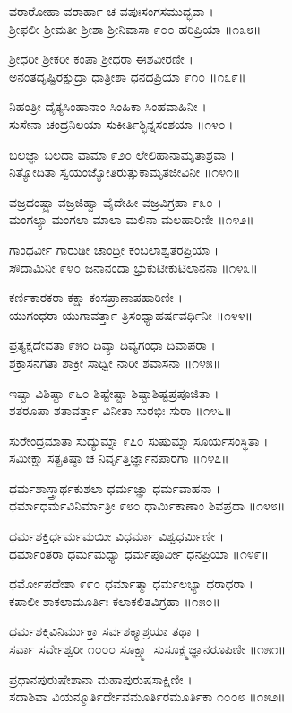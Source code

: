 ವರಾರೋಹಾ ವರಾರ್ಹಾ ಚ ವಪುಃಸಂಗಸಮುದ್ಭವಾ ।\\
ಶ್ರೀಫಲೀ ಶ್ರೀಮತೀ ಶ್ರೀಶಾ ಶ್ರೀನಿವಾಸಾ ೯೦೦ ಹರಿಪ್ರಿಯಾ ॥೧೩೮॥

ಶ್ರೀಧರೀ ಶ್ರೀಕರೀ ಕಂಪಾ ಶ್ರೀಧರಾ ಈಶವೀರಣೀ ।\\
ಅನಂತದೃಷ್ಟಿರಕ್ಷುದ್ರಾ ಧಾತ್ರೀಶಾ ಧನದಪ್ರಿಯಾ ೯೧೦ ॥೧೩೯॥

ನಿಹಂತ್ರೀ ದೈತ್ಯಸಿಂಹಾನಾಂ ಸಿಂಹಿಕಾ ಸಿಂಹವಾಹಿನೀ ।\\
ಸುಸೇನಾ ಚಂದ್ರನಿಲಯಾ ಸುಕೀರ್ತಿಶ್ಛಿನ್ನಸಂಶಯಾ ॥೧೪೦॥

ಬಲಜ್ಞಾ ಬಲದಾ ವಾಮಾ ೯೨೦ ಲೇಲಿಹಾನಾಮೃತಾಶ್ರವಾ ।\\
ನಿತ್ಯೋದಿತಾ ಸ್ವಯಂಜ್ಯೋತಿರುತ್ಸುಕಾಮೃತಜೀವಿನೀ ॥೧೪೧॥

ವಜ್ರದಂಷ್ಟ್ರಾ ವಜ್ರಜಿಹ್ವಾ ವೈದೇಹೀ ವಜ್ರವಿಗ್ರಹಾ ೯೩೦ ।\\
ಮಂಗಲ್ಯಾ ಮಂಗಲಾ ಮಾಲಾ ಮಲಿನಾ ಮಲಹಾರಿಣೀ ॥೧೪೨॥

ಗಾಂಧರ್ವೀ ಗಾರುಡೀ ಚಾಂದ್ರೀ ಕಂಬಲಾಶ್ವತರಪ್ರಿಯಾ ।\\
ಸೌದಾಮಿನೀ ೯೪೦ ಜನಾನಂದಾ ಭ್ರುಕುಟೀಕುಟಿಲಾನನಾ ॥೧೪೩॥

ಕರ್ಣಿಕಾರಕರಾ ಕಕ್ಷಾ ಕಂಸಪ್ರಾಣಾಪಹಾರಿಣೀ ।\\
ಯುಗಂಧರಾ ಯುಗಾವರ್ತ್ತಾ ತ್ರಿಸಂಧ್ಯಾಹರ್ಷವರ್ಧಿನೀ ॥೧೪೪॥

ಪ್ರತ್ಯಕ್ಷದೇವತಾ ೯೫೦ ದಿವ್ಯಾ ದಿವ್ಯಗಂಧಾ ದಿವಾಪರಾ ।\\
ಶಕ್ರಾಸನಗತಾ ಶಾಕ್ರೀ ಸಾಧ್ವೀ ನಾರೀ ಶವಾಸನಾ ॥೧೪೫॥

ಇಷ್ಟಾ ವಿಶಿಷ್ಟಾ ೯೬೦ ಶಿಷ್ಟೇಷ್ಟಾ ಶಿಷ್ಟಾಶಿಷ್ಟಪ್ರಪೂಜಿತಾ ।\\
ಶತರೂಪಾ ಶತಾವರ್ತ್ತಾ ವಿನೀತಾ ಸುರಭಿಃ ಸುರಾ ॥೧೪೬॥

ಸುರೇಂದ್ರಮಾತಾ ಸುದ್ಯುಮ್ನಾ ೯೭೦ ಸುಷುಮ್ನಾ ಸೂರ್ಯಸಂಸ್ಥಿತಾ ।\\
ಸಮೀಕ್ಷಾ ಸತ್ಪ್ರತಿಷ್ಠಾ ಚ ನಿರ್ವೃತ್ತಿರ್ಜ್ಞಾನಪಾರಗಾ ॥೧೪೭॥

ಧರ್ಮಶಾಸ್ತ್ರಾರ್ಥಕುಶಲಾ ಧರ್ಮಜ್ಞಾ ಧರ್ಮವಾಹನಾ ।\\
ಧರ್ಮಾಧರ್ಮವಿನಿರ್ಮಾತ್ರೀ ೯೮೦ ಧಾರ್ಮಿಕಾಣಾಂ ಶಿವಪ್ರದಾ ॥೧೪೮॥

ಧರ್ಮಶಕ್ತಿರ್ಧರ್ಮಮಯೀ ವಿಧರ್ಮಾ ವಿಶ್ವಧರ್ಮಿಣೀ ।\\
ಧರ್ಮಾಂತರಾ ಧರ್ಮಮಧ್ಯಾ ಧರ್ಮಪೂರ್ವೀ ಧನಪ್ರಿಯಾ ॥೧೪೯॥

ಧರ್ಮೋಪದೇಶಾ ೯೯೦ ಧರ್ಮಾತ್ಮಾ ಧರ್ಮಲಭ್ಯಾ ಧರಾಧರಾ ।\\
ಕಪಾಲೀ ಶಾಕಲಾಮೂರ್ತಿಃ ಕಲಾಕಲಿತವಿಗ್ರಹಾ ॥೧೫೦॥

ಧರ್ಮಶಕ್ತಿವಿನಿರ್ಮುಕ್ತಾ ಸರ್ವಶಕ್ತ್ಯಾಶ್ರಯಾ ತಥಾ ।\\
ಸರ್ವಾ ಸರ್ವೇಶ್ವರೀ ೧೦೦೦ ಸೂಕ್ಷ್ಮಾ ಸುಸೂಕ್ಷ್ಮಜ್ಞಾನರೂಪಿಣೀ ॥೧೫೧॥

ಪ್ರಧಾನಪುರುಷೇಶಾನಾ ಮಹಾಪುರುಷಸಾಕ್ಷಿಣೀ ।\\
ಸದಾಶಿವಾ ವಿಯನ್ಮೂರ್ತಿರ್ದೇವಮೂರ್ತಿರಮೂರ್ತಿಕಾ ೧೦೦೮ ॥೧೫೨॥

